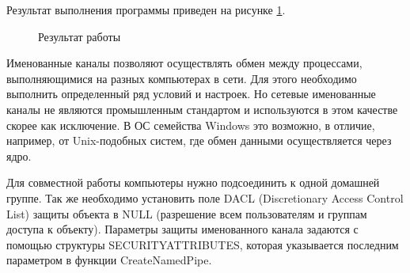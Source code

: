 \documentclass[a4paper]{article}
\begin{document}
	Результат выполнения программы приведен на рисунке \ref{img:task4_2}.
	\begin{figure}[h!]
		\caption{Результат работы}
		\label{img:task4_2}
	\end{figure}
	
	Именованные каналы позволяют осуществлять обмен между процессами, выполняющимися на разных компьютерах в сети. Для этого необходимо выполнить определенный ряд условий и настроек. Но сетевые именованные каналы не являются промышленным стандартом и используются в этом качестве скорее как исключение. В ОС семейства Windows это возможно, в отличие, например, от Unix-подобных систем, где обмен данными осуществляется через ядро.
	
	Для совместной работы компьютеры нужно подсоединить к одной домашней группе. Так же необходимо установить поле DACL (Discretionary Access Control List) защиты объекта в NULL (разрешение всем пользователям и группам доступа к объекту). Параметры защиты именованного канала задаются с помощью структуры SECURITYATTRIBUTES, которая указывается последним параметром в функции CreateNamedPipe.
	
\end{document}

